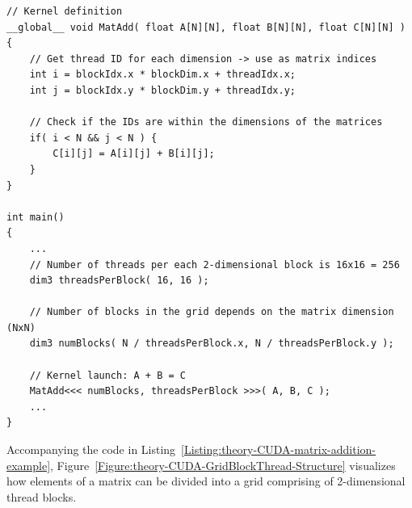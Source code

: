 \begin{lstlisting}[caption={Example of C++ pseudocode of a kernel that adds two matrices using 2-dimensional thread blocks. Since each thread has a unique \code{globalID} for each of two dimensions, then those IDs can be used as indices for adding matrix elements. This simple example does not take into account allocation and copying data from host to device. Taken from Nvidia's \emph{CUDA C++ Programming Guide} \cite{NVIDIAMay2022}.},label={Listing:theory-CUDA-matrix-addition-example}]
// Kernel definition
__global__ void MatAdd( float A[N][N], float B[N][N], float C[N][N] )
{
	// Get thread ID for each dimension -> use as matrix indices
	int i = blockIdx.x * blockDim.x + threadIdx.x;
	int j = blockIdx.y * blockDim.y + threadIdx.y;
	
	// Check if the IDs are within the dimensions of the matrices
	if( i < N && j < N ) {
		C[i][j] = A[i][j] + B[i][j];
	}
}

int main()
{
	...
	// Number of threads per each 2-dimensional block is 16x16 = 256
	dim3 threadsPerBlock( 16, 16 );
	
	// Number of blocks in the grid depends on the matrix dimension (NxN)
	dim3 numBlocks( N / threadsPerBlock.x, N / threadsPerBlock.y );
	
	// Kernel launch: A + B = C
	MatAdd<<< numBlocks, threadsPerBlock >>>( A, B, C );
	...
}
\end{lstlisting}

Accompanying the code in Listing~\ref{Listing:theory-CUDA-matrix-addition-example}, Figure~\ref{Figure:theory-CUDA-GridBlockThread-Structure} visualizes how elements of a matrix can be divided into a grid comprising of 2-dimensional thread blocks.

